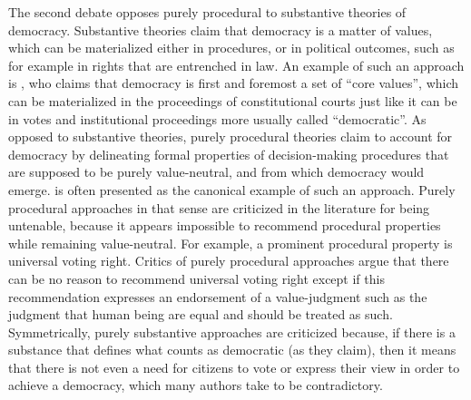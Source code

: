 \documentclass[preprint, french, english, 11pt]{elsarticle}%
\begin{document}
The second debate opposes purely procedural to substantive theories of democracy. Substantive theories claim that democracy is a matter of values, which can be materialized either in procedures, or in political outcomes, such as for example in rights that are entrenched in law. An example of such an approach is \cite{brettschneider_value_2006}, who claims that democracy is first and foremost a set of ``core values'', which can be materialized in the proceedings of constitutional courts just like it can be in votes and institutional proceedings more usually called ``democratic''. As opposed to substantive theories, purely procedural theories claim to account for democracy by delineating formal properties of decision-making procedures that are supposed to be purely value-neutral, and from which democracy would emerge. \cite{habermas_faktizitat_1992} is often presented as the canonical example of such an approach. Purely procedural approaches in that sense are criticized in the literature for being untenable, because it appears impossible to recommend procedural properties while remaining value-neutral. For example, a prominent procedural property is universal voting right. Critics of purely procedural approaches argue that there can be no reason to recommend universal voting right except if this recommendation expresses an endorsement of a value-judgment such as the judgment that human being are equal and should be treated as such. Symmetrically, purely substantive approaches are criticized because, if there is a substance that defines what counts as democratic (as they claim), then it means that there is not even a need for citizens to vote or express their view in order to achieve a democracy, which many authors take to be contradictory.
\end{document}
